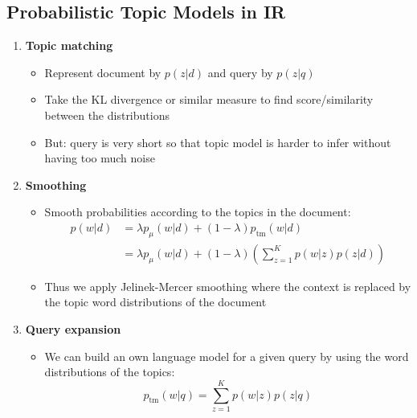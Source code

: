 \subsection{Probabilistic Topic Models in IR}
\begin{enumerate}
	\item \textbf{Topic matching}
	\begin{itemize}
		\item Represent document by $p(z|d)$ and query by $p(z|q)$
		\item Take the KL divergence or similar measure to find score/similarity between the distributions
		\item But: query is very short so that topic model is harder to infer without having too much noise
	\end{itemize}
	\item \textbf{Smoothing}
	\begin{itemize}
		\item Smooth probabilities according to the topics in the document:
		\begin{equation*}
			\begin{split}
				p(w|d) & = \lambda p_{\mu}(w|d) + (1 - \lambda) p_{\text{tm}}(w|d)\\
				& = \lambda p_{\mu}(w|d) + (1 - \lambda) \left(\sum\limits_{z=1}^{K} p(w|z) p(z|d)\right)
			\end{split}
		\end{equation*}
		\item Thus we apply Jelinek-Mercer smoothing where the context is replaced by the topic word distributions of the document
	\end{itemize}
	\item \textbf{Query expansion}
	\begin{itemize}
		\item We can build an own language model for a given query by using the word distributions of the topics:
		$$p_{\text{tm}}(w|q) = \sum\limits_{z=1}^{K} p(w|z) p(z|q)$$
	\end{itemize}
\end{enumerate}